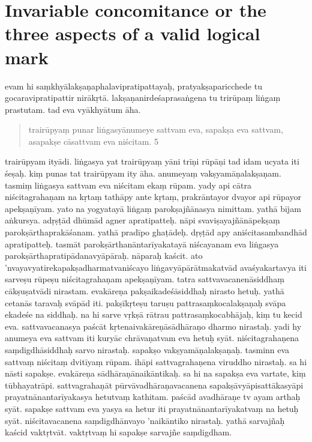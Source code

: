 \documentclass{article}
\begin{document}
\section{Invariable concomitance or the three aspects of a valid logical mark}
\pstart
evam hi saṃkhyālakṣaṇaphalavipratipattayaḥ, pratyakṣaparicchede tu gocaravipratipattir nirākṛtā. lakṣaṇanirdeśaprasaṅgena tu trirūpaṃ liṅgaṃ prastutam. tad eva vyākhyātum āha. 
\pend
\pstart
 \begin{quote}
trairūpyaṃ punar liṅgasyānumeye sattvam eva, sapakṣa eva sattvam, asapakṣe cāsattvam eva niścitam. 5
\end{quote}
\pend
\pstart
trairūpyam ityādi. liṅgasya yat trairūpyaṃ yāni trīṇi rūpāṇi tad idam ucyata iti śeṣaḥ. kiṃ punas tat trairūpyam ity āha. anumeyaṃ vakṣyamāṇalakṣaṇam. tasmiṃ liṅgasya sattvam eva niścitam ekaṃ rūpam. yady api cātra niścitagrahaṇam na kṛtaṃ tathāpy ante kṛtaṃ, prakrāntayor dvayor api rūpayor apekṣaṇīyam. yato na yogyatayā liṅgaṃ parokṣajñānasya nimittam. yathā  bījam aṅkursya. adṛṣṭād dhūmād agner apratipatteḥ. nāpi svaviṣayajñānāpekṣaṃ parokṣārthaprakāśanam. yathā pradīpo ghaṭādeḥ. dṛṣṭād apy aniścitasambandhād apratipatteḥ. tasmāt parokṣārthanāntarīyakatayā niścayanam eva liṅgasya parokṣārthapratipādanavyāpāraḥ. nāparaḥ kaścit. ato 'nvayavyatirekapakṣadharmatvaniścayo liṅgavyāpārātmakatvād avaśyakartavya iti sarveṣu rūpeṣu niścitagrahaṇam apekṣaṇīyam.
\pend
\pstart
 tatra sattvavacanenāsiddhaṃ cākṣuṣatvādi nirastam. evakāreṇa pakṣaikadeśāsiddhaḥ nirasto hetuḥ. yathā cetanās taravaḥ svāpād iti. pakṣīkṛteṣu taruṣu pattrasaṃkocalakṣaṇaḥ svāpa ekadeśe na siddhaḥ. na hi sarve vṛkṣā rātrau pattrasaṃkocabhājaḥ, kiṃ tu kecid eva. sattvavacanasya paścāt kṛtenaivakāreṇāsādhāraṇo dharmo nirastaḥ. yadi hy anumeya eva sattvam iti kuryāc chrāvaṇatvam eva hetuḥ syāt. niścitagrahaṇena saṃdigdhāsiddhaḥ sarvo nirastaḥ.
\pend
\pstart
 sapakṣo vakṣyamāṇalakṣaṇaḥ. tasminn eva sattvaṃ niścitaṃ dvitīyaṃ rūpam. ihāpi sattvagrahaṇena viruddho nirastaḥ. sa hi nāsti sapakṣe. evakāreṇa sādhāraṇānaikāntikaḥ. sa hi na sapakṣa eva vartate, kiṃ tūbhayatrāpi. sattvagrahaṇāt pūrvāvadhāraṇavacanena sapakṣāvyāpisattākasyāpi prayatnānantarīyakasya hetutvaṃ kathitam. paścād avadhāraṇe tv ayam arthaḥ syāt. sapakṣe sattvam eva yasya sa hetur iti prayatnānantarīyakatvaṃ na hetuḥ syāt. niścitavacanena saṃdigdhānvayo 'naikāntiko nirastaḥ. yathā sarvajñaḥ kaścid vaktṛtvāt. vaktṛtvaṃ hi sapakṣe sarvajñe saṃdigdham. 
\end{document}
